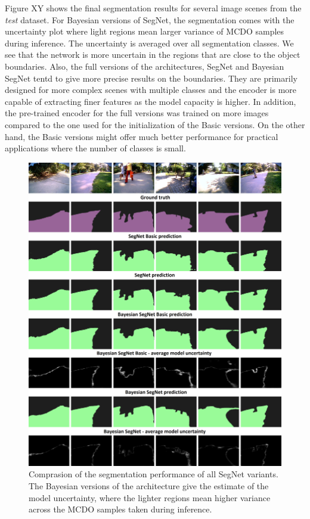 Figure XY shows the final segmentation results for several image scenes from the \textit{test} dataset. For Bayesian versions of SegNet, the segmentation comes with the uncertainty plot where light regions mean larger variance of MCDO samples during inference. The uncertainty is averaged over all segmentation classes. We see that the network is more uncertain in the regions that are close to the object boundaries. Also, the full versions of the architectures, SegNet and Bayesian SegNet tentd to give more precise results on the boundaries. They are primarily designed for more complex scenes with multiple classes and the encoder is more capable of extracting finer features as the model capacity is higher. In addition, the pre-trained encoder for the full versions was trained on more images compared to the one used for the initialization of the Basic versions. On the other hand, the Basic versions might offer much better performance for practical applications where the number of classes is small.

\begin{figure}[h]
	\begin{center}
		\includegraphics*[width=16cm, keepaspectratio]{obr/result.png}
	\end{center}
	\vspace{5mm}
	\caption{Comprasion of the segmentation performance of all SegNet variants. The Bayesian versions of the architecture give the estimate of the model uncertainty, where the lighter regions mean higher variance across the MCDO samples taken during inference.} 
	\label{}
\end{figure}
